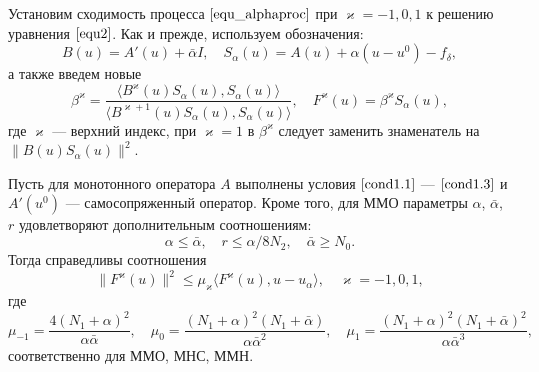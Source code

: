Установим сходимость процесса $\eqref{equ_alphaproc}$ при $\varkappa=-1,0,1$ к решению уравнения $\eqref{equ2}$. Как и прежде, используем обозначения: 
$$B(u)=A'(u)+\bar\alpha I, \quad S_\alpha (u)=A(u)+\alpha(u-u^0)-f_\delta,
$$
а также введем новые
$$\beta ^\varkappa =\frac{\langle B^\varkappa(u)S_\alpha(u), S_\alpha (u)\rangle}{\langle B^{\varkappa +1}(u)S_\alpha(u), S_\alpha(u)\rangle}, \quad F^\varkappa(u)=\beta^\varkappa S_\alpha(u), $$ 
где $\varkappa$ --- верхний индекс, при $\varkappa=1$ в $\beta^\varkappa$ следует заменить знаменатель на $\|B(u)S_\alpha(u)\|^2$.%
\begin{theorem}\label{teo3.1}
	Пусть для монотонного оператора $A$ выполнены условия $\eqref{cond1.1}$ --- $\eqref{cond1.3}$ и $A'(u^0)$ --- самосопряженный оператор. Кроме того, для ММО параметры $\alpha$, $\bar\alpha$, $r$ удовлетворяют дополнительным соотношениям:
	\begin{equation}\label{cond3.3}
	\alpha \le \bar\alpha, \quad r\le \alpha/8N_2, \quad \bar\alpha \ge N_0.
	\end{equation}
	Тогда справедливы соотношения
	\begin{equation}\label{ineq3.4}
	\|F^\varkappa(u)\|^2 \le \mu_\varkappa\langle F^\varkappa(u), u-u_\alpha\rangle, \quad \varkappa=-1,0,1,
	\end{equation} где
	\begin{equation}\label{cond3.5}
	\mu _{-1}=\frac{4(N_1+\alpha)^2}{\alpha\bar\alpha}, \quad \mu _0= \frac{(N_1+\alpha)^2(N_1+\bar\alpha)}{\alpha{\bar\alpha}^2}, \quad \mu_1= \frac{(N_1+\alpha)^2(N_1+\bar\alpha)^2}{\alpha{\bar\alpha}^3},
	\end{equation}
	соответственно для ММО, МНС, ММН.
\end{theorem}
